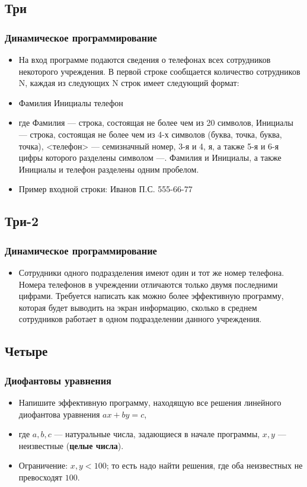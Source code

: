 \documentclass[compress,red]{beamer}
\begin{document}
\subsection{Три}
\begin{frame}[fragile]
  \frametitle{Динамическое программирование}
  \begin{itemize}
    \item На вход программе подаются сведения о телефонах всех сотрудников некоторого учреждения. В первой строке сообщается количество сотрудников N, каждая из следующих N строк имеет следующий формат: 
    \item Фамилия Инициалы телефон
    \item где Фамилия --- строка, состоящая не более чем из 20 символов, Инициалы --- строка, состоящая не более чем из 4-х символов (буква, точка, буква, точка), <телефон> --- семизначный номер, 3-я и 4, я, а также 5-я и 6-я цифры которого разделены символом ---. Фамилия и Инициалы, а также Инициалы и телефон разделены одним пробелом.
    \item Пример входной строки: Иванов П.С. 555-66-77
  \end{itemize}
\end{frame}

\subsection{Три-2}
\begin{frame}[fragile]
  \frametitle{Динамическое программирование}
  \begin{itemize}
    \item Сотрудники одного подразделения имеют один и тот же номер телефона. Номера телефонов в учреждении отличаются только двумя последними цифрами. Требуется написать как можно более эффективную программу, которая будет выводить на экран информацию, сколько в среднем сотрудников работает в одном подразделении данного учреждения.
  \end{itemize}
\end{frame}

\subsection{Четыре}
\begin{frame}[fragile]
  \frametitle{Диофантовы уравнения}
  \begin{itemize}
    \item Напишите эффективную программу, находящую все решения линейного диофантова уравнения $ax+by=c$,
    \item где $a, b, c$ --- натуральные числа, задающиеся в начале программы, $x, y$ --- неизвестные (\textbf{целые числа}).
    \item Ограничение: $x,y < 100$; то есть надо найти решения, где оба неизвестных не превосходят $100$.
  \end{itemize}
\end{frame}
\end{document}
